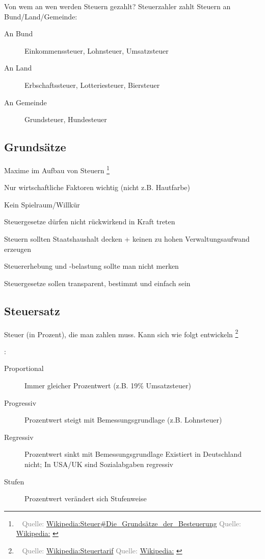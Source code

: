 \documentclass[draft]{beamer}
\newcommand{\n}{\hfill\\\vspace{0.25cm}}
\let\oldfootnote\footnote
\renewcommand{\footnote}[1]
{%
	\oldfootnote
	{
		\tiny
		\textcolor{gray}{\ #1}
	}%
}
\newcommand{\citewiki}[2][]
{%
	\footnote
	{
		\ifthenelse{\isempty{#1}}
		{
			Quelle: \href{https://de.wikipedia.org/wiki/#2}{Wikipedia:#2}
		}
		{
			Quelle: \href{https://de.wikipedia.org/wiki/#2}{Wikipedia:#1}
		}
	}
}
\begin{document}
			\begin{frame}{Von wem an wen werden Steuern gezahlt?}
				Steuerzahler zahlt Steuern an Bund/Land/Gemeinde:\n
				
				\begin{description}
					\item[An Bund] Einkommenssteuer, Lohnsteuer, Umsatzsteuer
					\item[An Land] Erbschaftssteuer, Lotteriesteuer, Biersteuer
					\item[An Gemeinde] Grundsteuer, Hundesteuer
				\end{description}
			\end{frame}
		
		\subsection{Grundsätze}
	
			\begin{frame}{Maxime im Aufbau von Steuern\citewiki{Steuer\#Die\_Grundsätze\_der\_Besteuerung}}
				\begin{description}[labelwidth=0cm]
					\item[Gerechtigkeit] Nur wirtschaftliche Faktoren wichtig (nicht z.B. Hautfarbe)
					\item[Gleichmäßigkeit] Kein Spielraum/Willkür
					\item[Rückwirkungsverbot] Steuergesetze dürfen nicht rückwirkend in Kraft treten
					\item[Ergiebigkeit] Steuern sollten Staatshaushalt decken + keinen zu hohen Verwaltungsaufwand erzeugen
					\item[Unmerklichkeit] Steuererhebung und -belastung sollte man nicht merken
					\item[Praktikabilität] Steuergesetze sollen transparent, bestimmt und einfach sein
				\end{description}
			\end{frame}
	
	\subsection{Steuersatz}
	
		\begin{frame}
			Steuer (in Prozent), die man zahlen muss. Kann sich wie folgt entwickeln\citewiki{Steuertarif}:\n
			\begin{description}
				\item[Proportional] Immer gleicher Prozentwert (z.B. 19\% Umsatzsteuer)
				\item[Progressiv] Prozentwert steigt mit Bemessungsgrundlage (z.B. Lohnsteuer)
				\item[Regressiv] Prozentwert sinkt mit Bemessungsgrundlage \vspace{0.1cm}\newline
				{\tiny Existiert in Deutschland nicht; In USA/UK sind Sozialabgaben regressiv\\}
				\item[Stufen] Prozentwert verändert sich Stufenweise
			\end{description}
		\end{frame}
	
\end{document}
